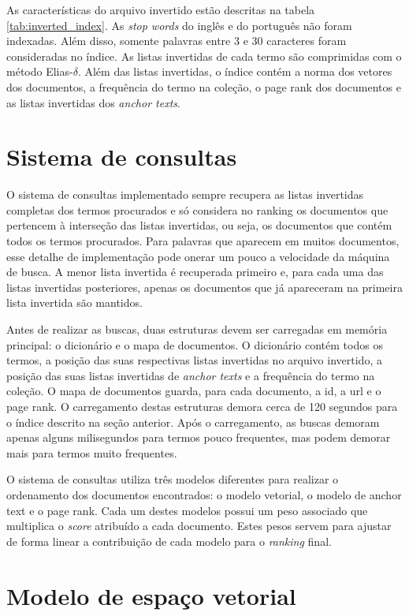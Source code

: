 \documentclass{article}
\begin{document}
As características do arquivo invertido estão descritas na 
tabela \ref{tab:inverted_index}. As \textit{stop words} do inglês e do 
português não foram indexadas. Além disso, somente palavras entre 3 e 30 caracteres
foram consideradas no índice. As listas invertidas de cada termo são comprimidas com
o método Elias-$ \delta $. Além das listas invertidas, o índice contém a norma dos vetores
dos documentos, a frequência do termo na coleção, o page rank dos documentos
e as listas invertidas dos \textit{anchor texts}. 

\section{Sistema de consultas}

O sistema de consultas implementado sempre recupera as listas invertidas completas dos termos
procurados e só considera no ranking os documentos que pertencem à interseção das listas invertidas, 
ou seja, os documentos que contém todos os termos procurados. Para palavras que aparecem em muitos documentos, esse
detalhe de implementação pode onerar um pouco a velocidade da máquina de busca. A menor lista 
invertida é recuperada primeiro e, para cada uma das listas invertidas posteriores, apenas os
documentos que já apareceram na primeira lista invertida são mantidos. 

Antes de realizar as buscas, duas estruturas devem ser carregadas em memória principal: 
o dicionário e o mapa de documentos. O dicionário contém todos os termos, a posição das
suas respectivas listas invertidas no arquivo invertido, a posição das suas listas invertidas
de \textit{anchor texts} e a frequência do termo na coleção. O mapa de documentos guarda, 
para cada documento, a id, a url e o page rank. O carregamento destas estruturas 
demora cerca de 120 segundos para o índice descrito na seção anterior. Após o carregamento, as buscas
demoram apenas alguns milisegundos para termos pouco frequentes, mas podem demorar mais para termos
muito frequentes.

O sistema de consultas utiliza três modelos diferentes para realizar o ordenamento dos documentos
encontrados: o modelo vetorial, o modelo de anchor text e o page rank. Cada um destes modelos
possui um peso associado que multiplica o \textit{score} atribuído a cada documento. Estes pesos
servem para ajustar de forma linear a contribuição de cada modelo para o \textit{ranking} final.

\section{Modelo de espaço vetorial}
\end{document}
